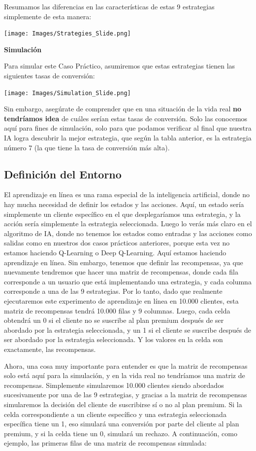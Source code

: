 \documentclass[
]{book}
\begin{document}
Resumamos las diferencias en las características de estas 9 estrategias simplemente de esta manera:

\texttt{[image: Images/Strategies\_Slide.png]}

\textbf{Simulación}

Para simular este Caso Práctico, asumiremos que estas estrategias tienen las siguientes tasas de conversión:

\texttt{[image: Images/Simulation\_Slide.png]}

Sin embargo, asegúrate de comprender que en una situación de la vida real \textbf{no tendríamos idea} de cuáles serían estas tasas de conversión. Solo las conocemos aquí para fines de simulación, solo para que podamos verificar al final que nuestra IA logra descubrir la mejor estrategia, que según la tabla anterior, es la estrategia número 7 (la que tiene la tasa de conversión más alta).

\hypertarget{definiciuxf3n-del-entorno}{%
\subsection{Definición del Entorno}\label{definiciuxf3n-del-entorno}}

El aprendizaje en línea es una rama especial de la inteligencia artificial, donde no hay mucha necesidad de definir los estados y las acciones. Aquí, un estado sería simplemente un cliente específico en el que desplegaríamos una estrategia, y la acción sería simplemente la estrategia seleccionada. Luego lo verás más claro en el algoritmo de IA, donde no tenemos los estados como entradas y las acciones como salidas como en nuestros dos casos prácticos anteriores, porque esta vez no estamos haciendo Q-Learning o Deep Q-Learning. Aquí estamos haciendo aprendizaje en línea. Sin embargo, tenemos que definir las recompensas, ya que nuevamente tendremos que hacer una matriz de recompensas, donde cada fila corresponde a un usuario que está implementando una estrategia, y cada columna corresponde a una de las 9 estrategias. Por lo tanto, dado que realmente ejecutaremos este experimento de aprendizaje en línea en 10.000 clientes, esta matriz de recompensas tendrá 10.000 filas y 9 columnas. Luego, cada celda obtendrá un 0 si el cliente no se suscribe al plan premium después de ser abordado por la estrategia seleccionada, y un 1 si el cliente se suscribe después de ser abordado por la estrategia seleccionada. Y los valores en la celda son exactamente, las recompensas.

Ahora, una cosa muy importante para entender es que la matriz de recompensas solo está aquí para la simulación, y en la vida real no tendríamos una matriz de recompensas. Simplemente simularemos 10.000 clientes siendo abordados sucesivamente por una de las 9 estrategias, y gracias a la matriz de recompensas simularemos la decisión del cliente de suscribirse sí o no al plan premium. Si la celda correspondiente a un cliente específico y una estrategia seleccionada específica tiene un 1, eso simulará una conversión por parte del cliente al plan premium, y si la celda tiene un 0, simulará un rechazo. A continuación, como ejemplo, las primeras filas de una matriz de recompensas simulada:
\end{document}
